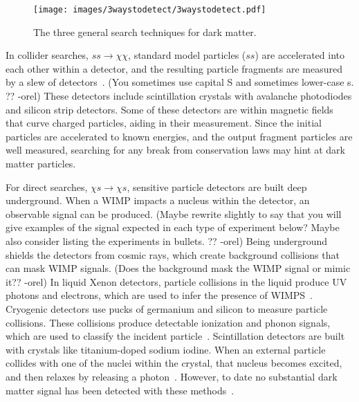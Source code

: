     \begin{figure}[ht]
      \centering
      \texttt{[image: images/3waystodetect/3waystodetect.pdf]}
      \caption[3 Search Techniques]{
        The three general search techniques for dark matter.}
      \label{fig:3_searches}
    \end{figure}
    
    In collider searches, $ss \rightarrow \chi\chi$, standard model particles ($ss$) are accelerated into each other within a detector, and the resulting particle fragments are measured by a slew of detectors~\cite{atlas,cms}.
    {\color{red}(You sometimes use capital S and sometimes lower-case s. ?? -orel)}
    These detectors include scintillation crystals with avalanche photodiodes and silicon strip detectors.
    Some of these detectors are within magnetic fields that curve charged particles, aiding in their measurement.
    Since the initial particles are accelerated to known energies, and the output fragment particles are well measured, searching for any break from conservation laws may hint at dark matter particles. 
    
    For direct searches, $\chi s \rightarrow \chi s$, sensitive particle detectors are built deep underground.
    When a WIMP impacts a nucleus within the detector, an observable signal can be produced.
    {\color{red}(Maybe rewrite slightly to say that you will give examples of the signal expected in each type of experiment below?  Maybe also consider listing  the experiments in bullets. ?? -orel)}
    Being underground shields the detectors from cosmic rays, which create background collisions that can mask WIMP signals.
    {\color{red}(Does the background mask the WIMP signal or mimic it?? -orel)}
    In liquid Xenon detectors, particle collisions in the liquid produce UV photons and electrons, which are used to infer the presence of WIMPS~\cite{direct_lux}.
    Cryogenic detectors use pucks of germanium and silicon to measure particle collisions.
    These collisions produce detectable ionization and phonon signals, which are used to classify the incident particle~\cite{direct_cdms}.
    Scintillation detectors are built with crystals like titanium-doped sodium iodine.
    When an external particle collides with one of the nuclei within the crystal, that nucleus becomes excited, and then relaxes by releasing a photon~\cite{direct_dama}.
    However, to date no substantial dark matter signal has been detected with these methods~\cite{direct_dm_detection}.
    
